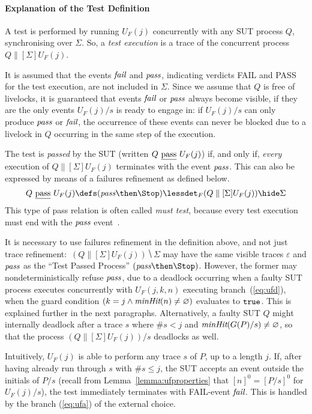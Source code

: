 \paragraph{Explanation of the Test Definition} A test \pagebreak is performed by running
$U_F(j)$ concurrently with any SUT process $Q$, synchronising over $\Sigma$.
So, a \emph{test execution} is a trace of the concurrent process
$Q\parallel[\Sigma] U_F(j)$.

It is assumed that the events ${\text{\it fail}}$ and ${\text{\it pass}}$, indicating verdicts FAIL
and PASS for the test execution, are not included in $\Sigma$. Since we
assume that $Q$ is free of livelocks, it is guaranteed that events ${\text{\it fail}}$
or ${\text{\it pass}}$ always become visible, if they are the only events $U_F(j)/s$ is
ready to engage in: if $U_F(j)/s$ can only produce ${\text{\it pass}}$ or ${\text{\it fail}}$, the
occurrence of these events can never be blocked due to a livelock in $Q$
occurring in the same step of the execution.


The test is \emph{passed} by the SUT (written $Q\ \underline{\text{pass}}\ U_F(j)$) if, and
only if, {\it every} execution of $Q\parallel[\Sigma] U_F(j)$ terminates with
the event ${\text{\it pass}}$. This can also be  expressed by means of a failures
refinement as defined below.
%
\begin{equation}
\label{eq:passF}
Q\ \pass\ U_F(j) \defs (\epass\then\Stop) \lessdet_F (Q\parallel[\Sigma] U_F(j)) \hide \Sigma
\end{equation}
%
This type of pass relation is often called \emph{must test}, because every
test execution must end with the ${\text{\it pass}}$
event~\cite{Hennessy:1988:ATP:50497}.

It is necessary to use failures refinement in the definition above, and not
just trace refinement:~$(Q\parallel[\Sigma] U_F(j)) \hide \Sigma$ may have
the same visible traces $\varepsilon$ and ${\text{\it pass}}$ as the ``Test Passed
Process'' $(\epass\then\Stop)$. However, the former may nondeterministically
refuse ${\text{\it pass}}$, due to a deadlock occurring when a faulty SUT process
executes concurrently with $U_F(j,k,n)$ executing branch~(\ref{eq:ufd}), when
the guard condition $(k = j\wedge \text{\it minHit}(n)\neq\varnothing)$ evaluates to
$\mbox{{\tt true}}$. This is explained further in the next paragraphs. Alternatively, a
faulty SUT $Q$ might internally deadlock after a trace $s$ where $\#s < j$
and $\text{\it minHit}(G(P)/s) \neq \varnothing$, so that the process
$(Q\parallel[\Sigma] U_F(j))/s$ deadlocks as well.

Intuitively, $U_F(j)$ is able to perform any trace $s$ of $P$, up to a length
$j$. If, after having already run through $s$ with $\#s \le j$, the SUT
accepts an event outside the initials of $P/s$
 (recall from Lemma~\ref{lemma:ufproperties} that $[n]^0 = [P/s]^0$ for $U_F(j)/s$),
the test immediately terminates with FAIL-event ${\text{\it fail}}$. This is handled by
the branch (\ref{eq:ufa}) of the external choice. %

